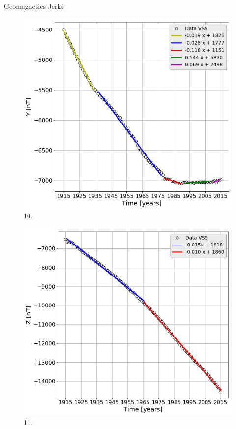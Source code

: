 \documentclass[final,t]{beamer}
\begin{document}
\begin{columns}[t]
\begin{column}{.25\linewidth}
\begin{block}{Geomagnetics Jerks}
		
		\begin{figure}
			\centering
			\includegraphics[scale=0.8]{"figs_ed/Linear regression Y_v3"}
			\caption{10.}
			\label{fintetico}
		\end{figure}	
		
		
		\begin{figure}
			\centering
			\includegraphics[scale=0.8]{"figs_ed/Linear regression Z_v3"}
			\caption{11.}
			\label{fig:g_Sintetico}
		\end{figure}
		

\end{block}
\end{column}
\end{columns}
\end{document}

